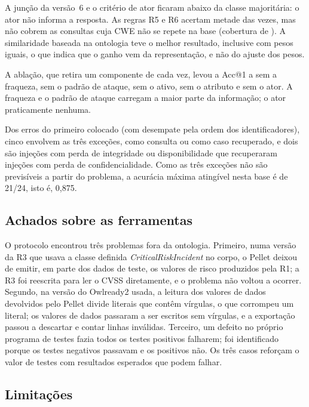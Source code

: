 \documentclass[12pt]{article}
\begin{document}
A junção da versão~6 e o critério de ator ficaram abaixo da classe majoritária: o ator não informa a resposta. As regras R5 e R6 acertam metade das vezes, mas não cobrem as consultas cuja CWE não se repete na base (cobertura de \covRule). A similaridade baseada na ontologia teve o melhor resultado, inclusive com pesos iguais, o que indica que o ganho vem da representação, e não do ajuste dos pesos.

A ablação, que retira um componente de cada vez, levou a Acc@1 a \ablWeakness{} sem a fraqueza, \ablPattern{} sem o padrão de ataque, \ablAsset{} sem o ativo, \ablAttribute{} sem o atributo e \ablActor{} sem o ator. A fraqueza e o padrão de ataque carregam a maior parte da informação; o ator praticamente nenhuma.

Dos erros do primeiro colocado (com desempate pela ordem dos identificadores), cinco envolvem as três exceções, como consulta ou como caso recuperado, e dois são injeções com perda de integridade ou disponibilidade que recuperaram injeções com perda de confidencialidade. Como as três exceções não são previsíveis a partir do problema, a acurácia máxima atingível nesta base é de 21/24, isto é, 0,875.

\subsection{Achados sobre as ferramentas}
\label{sec:achados}

O protocolo encontrou três problemas fora da ontologia. Primeiro, numa versão da R3 que usava a classe definida \emph{CriticalRiskIncident} no corpo, o Pellet deixou de emitir, em parte dos dados de teste, os valores de risco produzidos pela R1; a R3 foi reescrita para ler o CVSS diretamente, e o problema não voltou a ocorrer. Segundo, na versão do Owlready2 usada, a leitura dos valores de dados devolvidos pelo Pellet divide literais que contêm vírgulas, o que corrompeu um literal; os valores de dados passaram a ser escritos sem vírgulas, e a exportação passou a descartar e contar linhas inválidas. Terceiro, um defeito no próprio programa de testes fazia todos os testes positivos falharem; foi identificado porque os testes negativos passavam e os positivos não. Os três casos reforçam o valor de testes com resultados esperados que podem falhar.

\subsection{Limitações}
\end{document}
